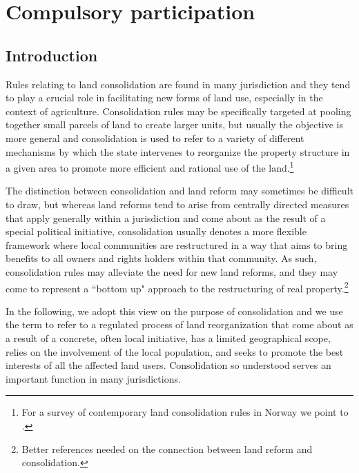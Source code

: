 \chapter{Compulsory participation}\label{chap:6}

\section{Introduction}\label{intro}

Rules relating to land consolidation are found in many jurisdiction and they tend to play a crucial role in facilitating new forms of land use, especially in the context of agriculture. Consolidation rules may be specifically targeted at pooling together small parcels of land to create larger units, but usually the objective is more general and consolidation is used to refer to a variety of different mechanisms by which the state intervenes to reorganize the property structure in a given area to promote more efficient and rational use of the land.\footnote{For a survey of contemporary land consolidation rules in Norway we point to \cite{vittikainen2004}.}

The distinction between consolidation and land reform may sometimes be difficult to draw, but whereas land reforms tend to arise from centrally directed measures that apply generally within a jurisdiction and come about as the result of a special political initiative, consolidation usually denotes a more flexible framework where local communities are restructured in a way that aims to bring benefits to all owners and rights holders within that community. As such, consolidation rules may alleviate the need for new land reforms, and they may come to represent a ``bottom up" approach to the restructuring of real property.\footnote{Better references needed on the connection between land reform and consolidation.}

In the following, we adopt this view on the purpose of consolidation and we use the term to refer to a regulated process of land reorganization that come about as a result of a concrete, often local initiative, has a limited geographical scope, relies on the involvement of the local population, and seeks to promote the best interests of all the affected land users. Consolidation so understood serves an important function in many jurisdictions. 

